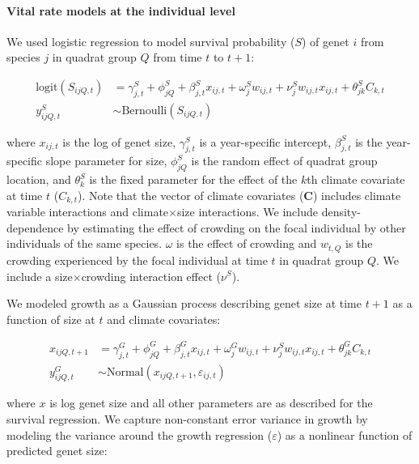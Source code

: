 \documentclass[12pt,]{article}
\begin{document}
\paragraph{Vital rate models at the individual
level}\label{vital-rate-models-at-the-individual-level}

We used logistic regression to model survival probability (\(S\)) of
genet \(i\) from species \(j\) in quadrat group \(Q\) from time \(t\) to
\(t+1\):

\begin{align}
\text{logit}(S_{ijQ,t}) &= \gamma^{S}_{j,t} + \phi^{S}_{jQ} + \beta^{S}_{j,t}x_{ij,t} + \omega^{S}_{j}w_{ij,t} + \nu^{S}_{j}w_{ij,t}x_{ij,t} + \theta^{S}_{jk}C_{k,t} \\
y^{S}_{ijQ,t} &\sim \text{Bernoulli}(S_{ijQ,t})
\end{align}

where \(x_{ij,t}\) is the log of genet size, \(\gamma^{S}_{j,t}\) is a
year-specific intercept, \(\beta^{S}_{j,t}\) is the year-specific slope
parameter for size, \(\phi^{S}_{jQ}\) is the random effect of quadrat
group location, and \(\theta^{S}_{k}\) is the fixed parameter for the
effect of the \(k\)th climate covariate at time \(t\) (\(C_{k,t}\)).
Note that the vector of climate covariates (\textbf{C}) includes climate
variable interactions and climate\(\times\)size interactions. We include
density-dependence by estimating the effect of crowding on the focal
individual by other individuals of the same species. \(\omega\) is the
effect of crowding and \(w_{t,Q}\) is the crowding experienced by the
focal individual at time \(t\) in quadrat group \(Q\). We include a
size\(\times\)crowding interaction effect (\(\nu^{S}\)).

We modeled growth as a Gaussian process describing genet size at time
\(t+1\) as a function of size at \(t\) and climate covariates:

\begin{align}
x_{ijQ,t+1} &= \gamma^{G}_{j,t} + \phi^{G}_{jQ} + \beta^{G}_{j,t}x_{ij,t} + \omega^{G}_{j}w_{ij,t} + \nu^{S}_{j}w_{ij,t}x_{ij,t} + \theta^{G}_{jk}C_{k,t} \\
y^{G}_{ijQ,t} &\sim \text{Normal}(x_{ijQ,t+1}, \varepsilon_{ij,t})
\end{align}

where \(x\) is log genet size and all other parameters are as described
for the survival regression. We capture non-constant error variance in
growth by modeling the variance around the growth regression
(\(\varepsilon\)) as a nonlinear function of predicted genet size:
\end{document}
